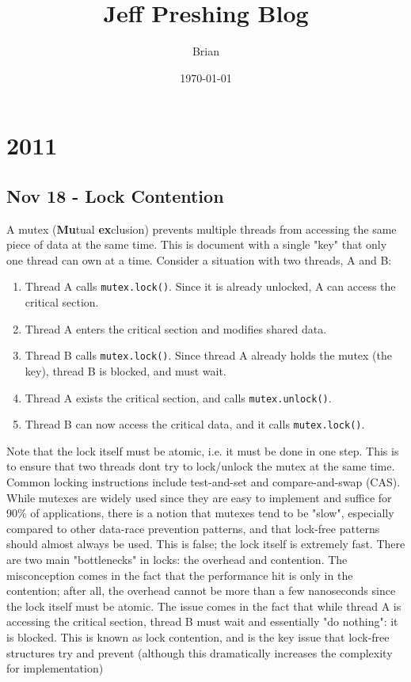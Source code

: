 \documentclass[11pt, a4paper]{article}
\title{Jeff Preshing Blog}
\author{Brian}
\date{\today}
\theoremstyle{definition}
\theoremstyle{remark}
\begin{document}
\maketitle
\tableofcontents          %
\newpage


\section{2011}
\subsection{Nov 18 - Lock Contention}
A mutex (\textbf{Mu}tual \textbf{ex}clusion) prevents multiple threads from accessing the same piece of data at the same time. This is document
with a single "key" that only one thread can own at a time. Consider a situation with two threads, A and B:
\begin{enumerate}
\item Thread A calls \lstinline|mutex.lock()|. Since it is already unlocked, A can access the critical section.
\item Thread A enters the critical section and modifies shared data.
\item Thread B calls \lstinline|mutex.lock()|. Since thread A already holds the mutex (the key), thread B is blocked, and must wait.
\item Thread A exists the critical section, and calls \lstinline|mutex.unlock()|.
\item Thread B can now access the critical data, and it calls \lstinline|mutex.lock()|.
\end{enumerate}
Note that the lock itself must be atomic, i.e. it must be done in one step. This is to ensure that two threads dont try to lock/unlock the mutex at the same time.
Common locking instructions include test-and-set and compare-and-swap (CAS). While mutexes are widely used since they are easy to implement and suffice for 90\% of applications,
there is a notion that mutexes tend to be "slow", especially compared to other data-race prevention patterns, and that lock-free patterns should almost always be used. This is false; the lock itself is extremely fast.
There are two main "bottlenecks" in locks: the overhead and contention. The misconception comes in the fact that the performance hit is only in the contention; after all, the overhead cannot be more than a few nanoseconds since the 
lock itself must be atomic. The issue comes in the fact that while thread A is accessing the critical section, thread B must wait and essentially "do nothing": it is blocked. This is known as lock contention, and is the key issue that lock-free structures try and prevent (although this dramatically increases the complexity for implementation)
\end{document}
